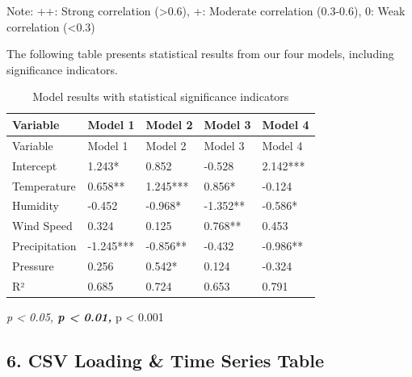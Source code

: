 \documentclass[
  letterpaper,
  oneside,
  openany]{MastersDoctoralThesis}
\begin{document}
Note: ++: Strong correlation (\textgreater0.6), +: Moderate correlation
(0.3-0.6), 0: Weak correlation (\textless0.3)

The following table presents statistical results from our four models,
including significance indicators.

\begin{longtable}[]{@{}lllll@{}}
\caption{Model results with statistical significance
indicators}\label{tbl-app-b-significance}\tabularnewline
\toprule\noalign{}
Variable & Model 1 & Model 2 & Model 3 & Model 4 \\
\midrule\noalign{}
\endfirsthead
\toprule\noalign{}
Variable & Model 1 & Model 2 & Model 3 & Model 4 \\
\midrule\noalign{}
\endhead
\bottomrule\noalign{}
\endlastfoot
Intercept & 1.243* & 0.852 & -0.528 & 2.142*** \\
Temperature & 0.658** & 1.245*** & 0.856* & -0.124 \\
Humidity & -0.452 & -0.968* & -1.352** & -0.586* \\
Wind Speed & 0.324 & 0.125 & 0.768** & 0.453 \\
Precipitation & -1.245*** & -0.856** & -0.432 & -0.986** \\
Pressure & 0.256 & 0.542* & 0.124 & -0.324 \\
R² & 0.685 & 0.724 & 0.653 & 0.791 \\
\end{longtable}

\emph{p \textless{} 0.05, \textbf{p \textless{} 0.01, }}p \textless{}
0.001

\subsection{6. CSV Loading \& Time Series Table}\label{sec-app-b-csv}
\end{document}
